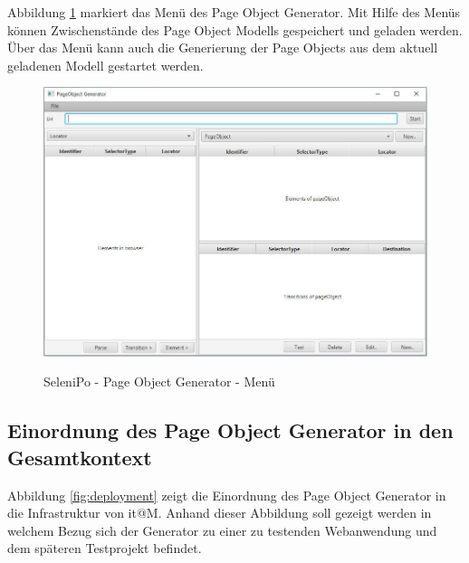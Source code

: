 \newpage

Abbildung \ref{fig:poGeneratorMenu} markiert das Menü des Page Object Generator. Mit Hilfe des Menüs können Zwischenstände des Page Object Modells gespeichert und geladen werden.
Über das Menü kann auch die Generierung der Page Objects aus dem aktuell geladenen Modell gestartet werden.

\begin{figure}[htb]
  \centering  
  \includegraphics[scale=0.5]{img/poGeneratorMenu.JPG}\\
  \caption{SeleniPo - Page Object Generator - Menü}
  \label{fig:poGeneratorMenu}
\end{figure}

\subsection{Einordnung des Page Object Generator in den Gesamtkontext}
\label{sec:deploymentsicht}


Abbildung \ref{fig:deployment} zeigt die Einordnung des Page Object Generator in die Infrastruktur von it@M. Anhand dieser Abbildung soll gezeigt werden in welchem Bezug sich der Generator zu einer zu testenden Webanwendung und dem späteren Testprojekt befindet.

